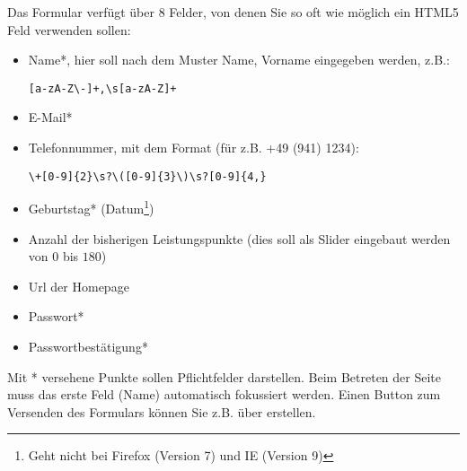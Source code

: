 %
\par Das Formular verfügt über 8 Felder, von denen Sie so oft wie möglich ein HTML5 Feld verwenden sollen:
%
\begin{itemize}
\item Name*, hier soll nach dem Muster Name, Vorname eingegeben werden, z.B.:
\begin{lstlisting}
[a-zA-Z\-]+,\s[a-zA-Z]+
\end{lstlisting}
\item E-Mail*
\item Telefonnummer, mit dem Format (für z.B. +49 (941) 1234):
\begin{lstlisting}
\+[0-9]{2}\s?\([0-9]{3}\)\s?[0-9]{4,}
\end{lstlisting}
\item Geburtstag* (Datum\footnote{Geht nicht bei Firefox (Version 7) und IE (Version 9)})
\item Anzahl der bisherigen Leistungspunkte (dies soll als Slider eingebaut werden von $0$ bis $180$)
\item Url der Homepage
\item Passwort*
\item Passwortbestätigung*
\end{itemize}
%
\par Mit * versehene Punkte sollen Pflichtfelder darstellen. Beim Betreten der Seite muss das erste Feld (Name) automatisch fokussiert werden. Einen Button zum Versenden des Formulars können Sie z.B. über  erstellen.